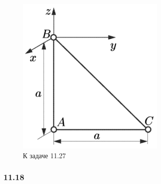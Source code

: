 \begin{figure}
\begin{minipage}[b]{0.35\textwidth}
            \includegraphics[width=0.65\textwidth]{figures/3.png}
            \caption{К задаче 11.27}
        \end{minipage}
\end{figure}




\subsubsection*{11.18}

